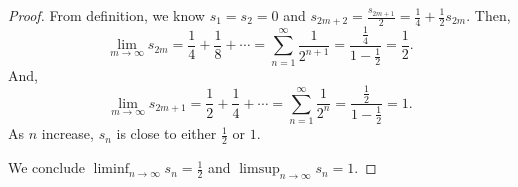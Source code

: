 \begin{Exercise}
	\begin{proof}
		From definition, we know $s_1 = s_2 = 0$ and $s_{2m+2} = \frac{s_{2m+1}}{2} = \frac{1}{4} + \frac{1}{2}s_{2m}$. Then,
		$$
		\lim_{m\to\infty} s_{2m}
		= \frac{1}{4} + \frac{1}{8} + \cdots
		= \sum_{n=1}^{\infty} \frac{1}{2^{n+1}}
		= \frac{\frac{1}{4}}{1 - \frac{1}{2}}
		= \frac{1}{2}.
		$$
		And,
		$$
		\lim_{m\to\infty} s_{2m+1}
		= \frac{1}{2} + \frac{1}{4} + \cdots
		= \sum_{n=1}^{\infty} \frac{1}{2^n}
		= \frac{\frac{1}{2}}{1 - \frac{1}{2}}
		= 1.
		$$
		As $n$ increase, $s_n$ is close to either $\frac{1}{2}$ or $1$.
		
		We conclude $\liminf_{n\to\infty} s_n = \frac{1}{2}$ and $\limsup_{n\to\infty} s_n = 1$.
	\end{proof}
\end{Exercise}